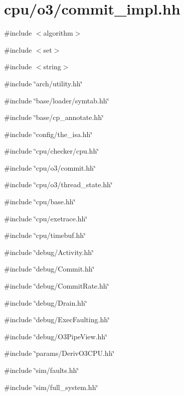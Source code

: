 \hypertarget{commit__impl_8hh}{
\section{cpu/o3/commit\_\-impl.hh}
\label{commit__impl_8hh}
}
{\ttfamily \#include $<$algorithm$>$}\par
{\ttfamily \#include $<$set$>$}\par
{\ttfamily \#include $<$string$>$}\par
{\ttfamily \#include \char`\"{}arch/utility.hh\char`\"{}}\par
{\ttfamily \#include \char`\"{}base/loader/symtab.hh\char`\"{}}\par
{\ttfamily \#include \char`\"{}base/cp\_\-annotate.hh\char`\"{}}\par
{\ttfamily \#include \char`\"{}config/the\_\-isa.hh\char`\"{}}\par
{\ttfamily \#include \char`\"{}cpu/checker/cpu.hh\char`\"{}}\par
{\ttfamily \#include \char`\"{}cpu/o3/commit.hh\char`\"{}}\par
{\ttfamily \#include \char`\"{}cpu/o3/thread\_\-state.hh\char`\"{}}\par
{\ttfamily \#include \char`\"{}cpu/base.hh\char`\"{}}\par
{\ttfamily \#include \char`\"{}cpu/exetrace.hh\char`\"{}}\par
{\ttfamily \#include \char`\"{}cpu/timebuf.hh\char`\"{}}\par
{\ttfamily \#include \char`\"{}debug/Activity.hh\char`\"{}}\par
{\ttfamily \#include \char`\"{}debug/Commit.hh\char`\"{}}\par
{\ttfamily \#include \char`\"{}debug/CommitRate.hh\char`\"{}}\par
{\ttfamily \#include \char`\"{}debug/Drain.hh\char`\"{}}\par
{\ttfamily \#include \char`\"{}debug/ExecFaulting.hh\char`\"{}}\par
{\ttfamily \#include \char`\"{}debug/O3PipeView.hh\char`\"{}}\par
{\ttfamily \#include \char`\"{}params/DerivO3CPU.hh\char`\"{}}\par
{\ttfamily \#include \char`\"{}sim/faults.hh\char`\"{}}\par
{\ttfamily \#include \char`\"{}sim/full\_\-system.hh\char`\"{}}\par
